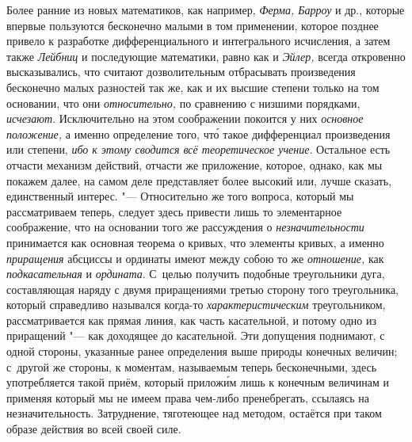 Более ранние из новых математиков, как например, {\em Ферма, Барроу} и
др., которые впервые пользуются бесконечно малыми в том применении, которое
позднее привело к разработке дифференциального и интегрального исчисления, а
затем также {\em Лейбниц} и последующие математики, равно как и {\em Эйлер,}
всегда откровенно высказывались, что считают дозволительным отбрасывать
произведения бесконечно малых разностей так же, как и их высшие степени только
на том основании, что они {\em относительно,} по сравнению с низшими порядками,
{\em исчезают}. Исключительно на этом соображении покоится у них
{\em основное положение,} а именно определение того, чт\'{о} такое дифференциал
произведения или степени, {\em ибо к этому сводится всё теоретическое
учение}. Остальное есть отчасти механизм действий, отчасти же приложение,
которое, однако, как мы покажем далее, на самом деле представляет более высокий
или, лучше сказать, единственный интерес. "--- Относительно же того вопроса,
который мы рассматриваем теперь, следует здесь привести лишь то элементарное
соображение, что на основании того же рассуждения о {\em незначительности}
принимается как основная теорема о кривых, что элементы кривых, а именно
{\em приращения} абсциссы и ординаты имеют между собою то же {\em отношение,}
как {\em подкасательная} и {\em ордината}. С~целью получить подобные
треугольники дуга, составляющая наряду с двумя приращениями третью сторону того
треугольника, который справедливо назывался когда-то {\em характеристическим}
треугольником, рассматривается как прямая линия, как часть касательной, и
потому одно из приращений "--- как доходящее до касательной. Эти допущения
поднимают, с одной стороны, указанные ранее определения выше природы конечных
величин; с~другой же стороны, к моментам, называемым теперь бесконечными, здесь
употребляется такой приём, который прилож\'{и}м лишь к конечным величинам и
применяя который мы не имеем права чем-либо пренебрегать, ссылаясь на
незначительность. Затруднение, тяготеющее над методом, остаётся при таком
образе действия во всей своей силе.


